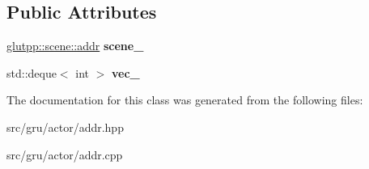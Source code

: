 \subsection*{\-Public \-Attributes}
\begin{DoxyCompactItemize}
\item 
\hypertarget{classglutpp_1_1actor_1_1addr_a46004401839d612ac561c9cb54417ec8}{\hyperlink{classglutpp_1_1scene_1_1addr}{glutpp\-::scene\-::addr} {\bfseries scene\-\_\-}}\label{classglutpp_1_1actor_1_1addr_a46004401839d612ac561c9cb54417ec8}

\item 
\hypertarget{classglutpp_1_1actor_1_1addr_a37b544eaff8b11d30c238b9a6eb94443}{std\-::deque$<$ int $>$ {\bfseries vec\-\_\-}}\label{classglutpp_1_1actor_1_1addr_a37b544eaff8b11d30c238b9a6eb94443}

\end{DoxyCompactItemize}


\-The documentation for this class was generated from the following files\-:\begin{DoxyCompactItemize}
\item 
src/gru/actor/addr.\-hpp\item 
src/gru/actor/addr.\-cpp\end{DoxyCompactItemize}
